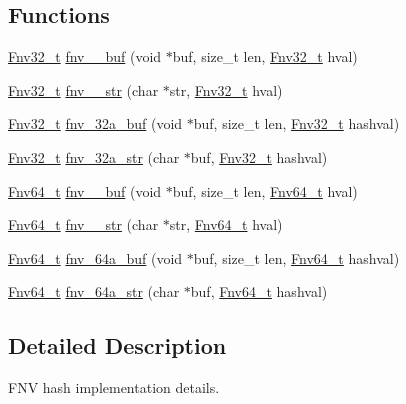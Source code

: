 \subsection*{Functions}
\begin{DoxyCompactItemize}
\item 
\hyperlink{group__hash__fnv_ga6de33672f4d12dba1c58d1b9ff210d65}{Fnv32\+\_\+t} \hyperlink{group__hash__fnv_gadaf15dca2b23a80e5cf6ce781da4906c}{fnv\+\_\+\_\+buf} (void $\ast$buf, size\+\_\+t len, \hyperlink{group__hash__fnv_ga6de33672f4d12dba1c58d1b9ff210d65}{Fnv32\+\_\+t} hval)
\item 
\hyperlink{group__hash__fnv_ga6de33672f4d12dba1c58d1b9ff210d65}{Fnv32\+\_\+t} \hyperlink{group__hash__fnv_ga468252c78bf386134ad329d81d4d6eea}{fnv\+\_\+\_\+str} (char $\ast$str, \hyperlink{group__hash__fnv_ga6de33672f4d12dba1c58d1b9ff210d65}{Fnv32\+\_\+t} hval)
\item 
\hyperlink{group__hash__fnv_ga6de33672f4d12dba1c58d1b9ff210d65}{Fnv32\+\_\+t} \hyperlink{group__hash__fnv_gaf1f4a73d8e353e33a70f6a0e9cb44f9b}{fnv\+\_\+32a\+\_\+buf} (void $\ast$buf, size\+\_\+t len, \hyperlink{group__hash__fnv_ga6de33672f4d12dba1c58d1b9ff210d65}{Fnv32\+\_\+t} hashval)
\item 
\hyperlink{group__hash__fnv_ga6de33672f4d12dba1c58d1b9ff210d65}{Fnv32\+\_\+t} \hyperlink{group__hash__fnv_ga6b0ed3c48edfd96df1222d7a414ef6d1}{fnv\+\_\+32a\+\_\+str} (char $\ast$buf, \hyperlink{group__hash__fnv_ga6de33672f4d12dba1c58d1b9ff210d65}{Fnv32\+\_\+t} hashval)
\item 
\hyperlink{group__hash__fnv_ga4b6673bffbef8355685a9e0129b86e16}{Fnv64\+\_\+t} \hyperlink{group__hash__fnv_gab250be2cf62835a4221cd58bf8cb136c}{fnv\+\_\+\_\+buf} (void $\ast$buf, size\+\_\+t len, \hyperlink{group__hash__fnv_ga4b6673bffbef8355685a9e0129b86e16}{Fnv64\+\_\+t} hval)
\item 
\hyperlink{group__hash__fnv_ga4b6673bffbef8355685a9e0129b86e16}{Fnv64\+\_\+t} \hyperlink{group__hash__fnv_ga5de54a6ab9399b2e6780a3867889c568}{fnv\+\_\+\_\+str} (char $\ast$str, \hyperlink{group__hash__fnv_ga4b6673bffbef8355685a9e0129b86e16}{Fnv64\+\_\+t} hval)
\item 
\hyperlink{group__hash__fnv_ga4b6673bffbef8355685a9e0129b86e16}{Fnv64\+\_\+t} \hyperlink{group__hash__fnv_ga61da2150923405756a0fd5ae19170dd2}{fnv\+\_\+64a\+\_\+buf} (void $\ast$buf, size\+\_\+t len, \hyperlink{group__hash__fnv_ga4b6673bffbef8355685a9e0129b86e16}{Fnv64\+\_\+t} hashval)
\item 
\hyperlink{group__hash__fnv_ga4b6673bffbef8355685a9e0129b86e16}{Fnv64\+\_\+t} \hyperlink{group__hash__fnv_gaa404ed488258e9943aa51a90e6dea631}{fnv\+\_\+64a\+\_\+str} (char $\ast$buf, \hyperlink{group__hash__fnv_ga4b6673bffbef8355685a9e0129b86e16}{Fnv64\+\_\+t} hashval)
\end{DoxyCompactItemize}


\subsection{Detailed Description}
F\+NV hash implementation details. 